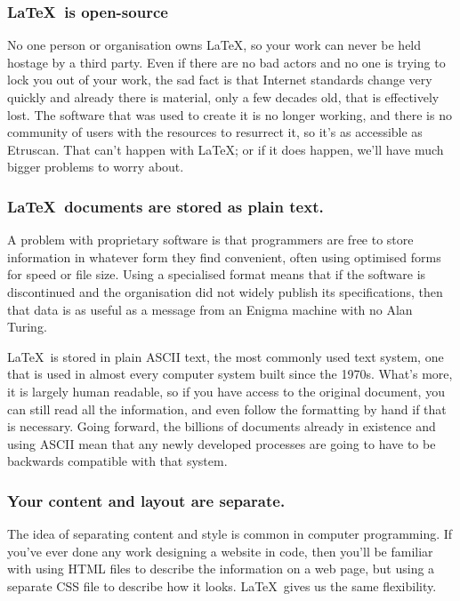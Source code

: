 \documentclass[12pt]{extarticle}
\begin{document}
\subsubsection{\LaTeX\ is open-source}
No one person or organisation owns \LaTeX, so your work can never be held hostage by a third party. Even if there are no bad actors and no one is trying to lock you out of your work, the sad fact is that Internet standards change very quickly and already there is material, only a few decades old, that is effectively lost. The software that was used to create it is no longer working, and there is no community of users with the resources to resurrect it, so it's as accessible as Etruscan. That can't happen with \LaTeX; or if it does happen, we'll have much bigger problems to worry about.
\subsubsection{\LaTeX\ documents are stored as plain text.}
A problem with proprietary software is that programmers are free to store information in whatever form they find convenient, often using optimised forms for speed or file size. Using a specialised format means that if the software is discontinued and the organisation did not widely publish its specifications, then that data is as useful as a message from an Enigma machine with no Alan Turing.

\LaTeX\ is stored in plain ASCII text, the most commonly used text system, one that is used in almost every computer system built since the 1970s. What's more, it is largely human readable, so if you have access to the original document, you can still read all the information, and even follow the formatting by hand if that is necessary. Going forward, the billions of documents already in existence and using ASCII mean that any newly developed processes are going to have to be backwards compatible with that system.
\subsubsection{Your content and layout are separate.}
The idea of separating content and style is common in computer programming. If you've ever done any work designing a website in code, then you'll be familiar with using HTML files to describe the information on a web page, but using a separate CSS file to describe how it looks. \LaTeX\ gives us the same flexibility.
\end{document}
